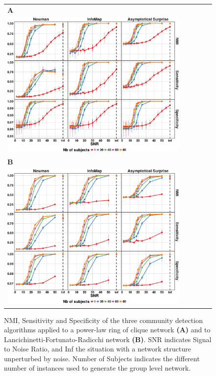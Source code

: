 \begin{figure}[!htb]
\centering
    \begin{tabular}{l}
        \textbf{\textsf{A}}  \\
        \includegraphics[width=0.85\textwidth]{images/pacopaperfigure4.pdf} \\
        \textbf{\textsf{B}}  \\
        \includegraphics[width=0.85\textwidth]{images/pacopaperfigure5.pdf}
    \end{tabular}
    \caption{NMI, Sensitivity and Specificity of the three community detection algorithms applied to a power-law ring of clique network \textbf{(A)} and to Lancichinetti-Fortunato-Radicchi network \textbf{(B)}. SNR indicates Signal to Noise Ratio, and Inf the situation with a network structure unperturbed by noise. Number of Subjects indicates the different number of instances used to generate the group level network.}
    \label{fig:nmisensitivityspecificity}
\end{figure}


